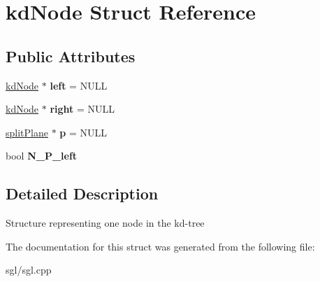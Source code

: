 \hypertarget{structkd_node}{}\section{kd\+Node Struct Reference}
\label{structkd_node}
\subsection*{Public Attributes}
\begin{DoxyCompactItemize}
\item 
\mbox{\label{structkd_node_a144866f55d774d1471f8f557ae17b001}} 
\hyperlink{structkd_node}{kd\+Node} $\ast$ {\bfseries left} = N\+U\+LL
\item 
\mbox{\label{structkd_node_a73f12ec56a1be783663f1f548d792674}} 
\hyperlink{structkd_node}{kd\+Node} $\ast$ {\bfseries right} = N\+U\+LL
\item 
\mbox{\label{structkd_node_addf0bbf5ea5bb36f77949d96e32046b8}} 
\hyperlink{classsplit_plane}{split\+Plane} $\ast$ {\bfseries p} = N\+U\+LL
\item 
\mbox{\label{structkd_node_afb1ac2fdc9cd3eb52d849855bedac531}} 
bool {\bfseries N\+\_\+\+P\+\_\+left}
\end{DoxyCompactItemize}


\subsection{Detailed Description}
Structure representing one node in the kd-\/tree 

The documentation for this struct was generated from the following file\+:\begin{DoxyCompactItemize}
\item 
sgl/sgl.\+cpp\end{DoxyCompactItemize}
